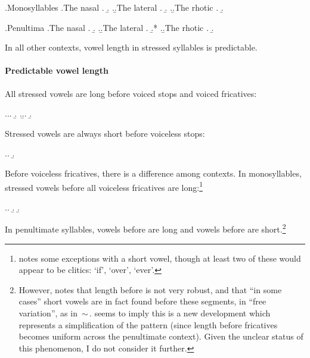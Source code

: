 \ex.Monosyllables
\a.The nasal \ipa{[n]}
\a.
\b.
\z.\b.The lateral \ipa{[l]}
\a.
\b.\label{ex:pw-wal}
\z.\b.The rhotic \ipa{[r]}
\a.
\b.

\ex.Penultima
\a.The nasal \ipa{[n]}
\a.
\b.
\z.\b.The lateral \ipa{[l]}
\a.
\b.*
\z.\b.The rhotic \ipa{[r]}
\a.
\b.

In all other contexts, vowel length in stressed syllables is predictable.

\paragraph{Predictable vowel length}
\label{sec:pred-vowel-length}

All stressed vowels are long before voiced stops and voiced fricatives:

\ex.\a.\a.
\b.
\z.\b.\a.
\b.

Stressed vowels are always short before voiceless stops:

\ex.\a.
\b.

Before voiceless fricatives, there is a difference among contexts. In monosyllables, stressed vowels before all voiceless fricatives are long:\footnote{\citet{awbery86:_pembr_welsh} notes some exceptions with a short vowel, though at least two of these would appear to be clitics: \ipa{[ɔs]} `if', \ipa{[drɔs]} `over', \ipa{[bɪθ]} `ever'.}

\ex.\a.
\b.
\b.

In penultimate syllables, vowels before \ipa{[f~θ~χ]} are long and vowels before \ipa{[s~ʃ~ɬ]} are short.\footnote{However, \citet[p.~24]{awbery86:_pembr_welsh} notes that length before \ipa{[f~θ~χ]} is not very robust, and that \enquote{in some cases} short vowels are in fact found before these segments, in \enquote{free variation}, as in \,$\sim$\,. \citet{awbery86:_pembr_welsh} seems to imply this is a new development which represents a simplification of the pattern (since length before fricatives becomes uniform across the penultimate context). Given the unclear status of this phenomenon, I do not consider it further.}

